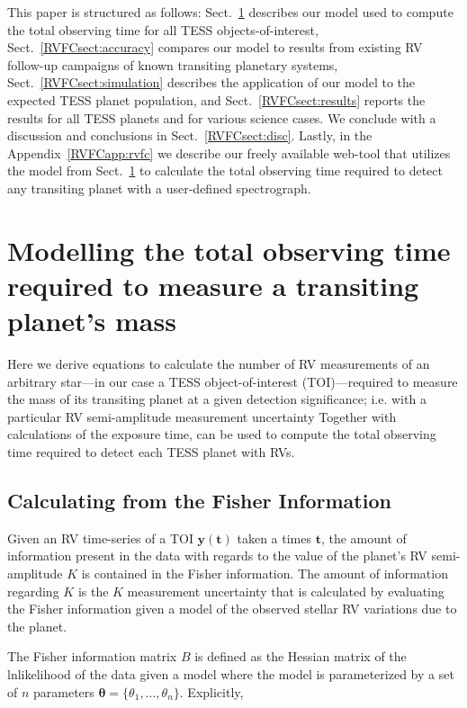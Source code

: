 This paper is structured as follows: Sect.~\ref{RVFCsect:model} describes our model used to compute the
total observing time for all TESS objects-of-interest, Sect.~\ref{RVFCsect:accuracy} compares our model to
results from existing RV follow-up campaigns of known transiting planetary systems,
Sect.~\ref{RVFCsect:simulation} describes the application of our model to the expected
TESS planet population, and Sect.~\ref{RVFCsect:results} reports the results for all TESS planets and for
various science cases. We conclude with a discussion and conclusions in Sect.~\ref{RVFCsect:disc}. 
Lastly, in the Appendix~\ref{RVFCapp:rvfc}
we describe our freely available web-tool that utilizes the model from Sect.~\ref{RVFCsect:model}
to calculate the total observing time required to detect any transiting planet with a
user-defined spectrograph.


\section{Modelling the total observing time required to measure a transiting planet's mass} \label{RVFCsect:model}
Here we derive equations to calculate the number of RV measurements \nrv{,}
of an arbitrary star---in our case a TESS object-of-interest (TOI)---required to measure the mass of
its transiting planet at a given
detection significance; i.e. with a particular RV semi-amplitude measurement uncertainty 
Together with calculations of the exposure time, \nrv{} can be used to
compute the total observing time required to detect each TESS planet with RVs.

\subsection{Calculating \sigK{} from the Fisher Information} \label{RVFCsect:fisher}
Given an RV time-series of a TOI $\mathbf{y}(\mathbf{t})$ taken a times $\mathbf{t}$,
the amount of information present in the data with regards to the value of
the planet's RV semi-amplitude $K$ is contained in the Fisher information. The amount of
information regarding $K$ is the $K$ measurement uncertainty \sigK{,} that is calculated by
evaluating the Fisher information given a model of the observed stellar RV variations due to the
planet.

The Fisher
information matrix $B$ is defined as the Hessian matrix of the lnlikelihood of the data given a model
where the model is parameterized by a set of $n$ parameters $\boldsymbol{\theta}=\{\theta_1,\dots,\theta_n\}$.
Explicitly,


